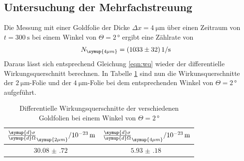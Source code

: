 \subsection{Untersuchung der Mehrfachstreuung}
Die Messung mit einer Goldfolie der Dicke $\Delta x = \SI{4}{\micro\meter}$ über einen
Zeitraum von $t = \SI{300}{\second}$ bei einem Winkel von $\Theta = 2 \, °$ ergibt
eine Zählrate von
\begin{equation*}
  N_\symup{4\mu m} = \SI{1033(32)}{1\per\second}
\end{equation*}
Daraus lässt sich entsprechend Gleichung \ref{eqn:wq} wieder der differentielle Wirkungsquerschnitt
berechnen. In Tabelle \ref{tab:wq} sind nun die Wirkunsquerschnitte der $\SI{2}{\micro\meter}$-Folie
und der $\SI{4}{\micro\meter}$-Folie bei dem entsprechenden Winkel von $\Theta = 2 \, °$ aufgeführt.
\begin{table}[H]
  \centering
  \caption{Differentielle Wirkungsquerschnitte der verschiedenen Goldfolien bei einem Winkel von $\Theta = 2 \, °$}
  \label{tab:wq}
  \begin{tabular}{c c}
    \toprule
    $\frac{\symup{d}\sigma}{\symup{d}\Omega}_\symup{2\mu m} /  10^{-23}\, \mathrm{m}$ & $\frac{\symup{d}\sigma}{\symup{d}\Omega}_\symup{4\mu m}/ 10^{-23}\, \mathrm{m}$ \\
    \midrule
    $\SI{30.08(72)}{}$ & $\SI{5.93(18)}{}$  \\
    \bottomrule
  \end{tabular}
\end{table}


